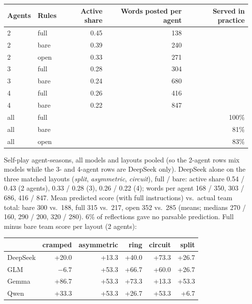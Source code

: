\documentclass{article}
\begin{document}
\begin{center}\small
\begin{tabular}{llrrr}
\toprule
Agents & Rules & Active share & Words posted per agent & Served in practice\\
\midrule
2 & full & 0.45 & 138 & \\
2 & bare & 0.39 & 240 & \\
2 & open & 0.33 & 271 & \\
3 & full & 0.28 & 304 & \\
3 & bare & 0.24 & 680 & \\
4 & full & 0.26 & 416 & \\
4 & bare & 0.22 & 847 & \\
\midrule
all & full & & & 100\%\\
all & bare & & & 81\%\\
all & open & & & 83\%\\
\bottomrule
\end{tabular}
\end{center}
Self-play agent-seasons, all models and layouts pooled (so the 2-agent rows mix models while the 3- and 4-agent rows are DeepSeek only). DeepSeek alone on the three matched layouts (\emph{split}, \emph{asymmetric}, \emph{circuit}), full / bare: active share 0.54 / 0.43 (2 agents), 0.33 / 0.28 (3), 0.26 / 0.22 (4); words per agent 168 / 350, 303 / 686, 416 / 847. Mean predicted score (with full instructions) vs.\ actual team total: bare 300 vs.\ 188, full 315 vs.\ 217, open 352 vs.\ 285 (means; medians 270 / 160, 290 / 200, 320 / 280). 6\% of reflections gave no parsable prediction. Full minus bare team score per layout (2 agents):
\begin{center}\small
\begin{tabular}{lrrrrr}
\toprule
& cramped & asymmetric & ring & circuit & split\\
\midrule
DeepSeek & +20.0 & +13.3 & +40.0 & +73.3 & +26.7\\
GLM & $-6.7$ & +53.3 & +66.7 & +60.0 & +26.7\\
Gemma & +86.7 & +53.3 & +73.3 & +13.3 & +53.3\\
Qwen & +33.3 & +53.3 & +26.7 & +53.3 & +6.7\\
\bottomrule
\end{tabular}
\end{center}
\end{document}
